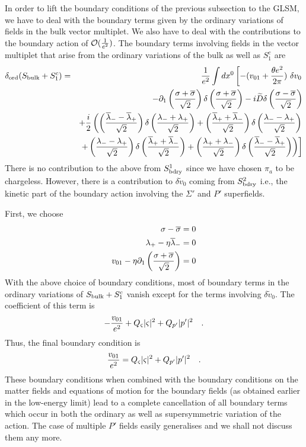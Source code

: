 \documentclass[a4paper,12pt]{article}
\begin{document}
In order to lift the boundary conditions of the previous subsection
to the GLSM,
we have to deal with the boundary terms given by the ordinary
variations of fields in the bulk vector multiplet. We also
have to deal with the contributions to the boundary action of
${\cal O}({1\over{e^2}})$. 
The boundary terms involving fields in the vector multiplet
that arise from the ordinary variations of the 
bulk as well as $S_1^c$ are
\begin{eqnarray*}
\delta_{\rm ord} (S_{\rm bulk}+S_1^c) &=& {1\over{e^2}} \int dx^0 \left [
-(v_{01} + {{\theta e^2} \over{2\pi}})\ \delta v_0 \right. \\ 
&&- \partial_1\left({{\sigma + \overline{\sigma}}\over{\sqrt2}}
\right) \delta \left({{\sigma + \overline{\sigma}}\over{\sqrt2}} \right)
-i\widetilde{D} 
\delta \left({{\sigma - \overline{\sigma}}\over{\sqrt2}} \right)   \\
&& +{i\over2}\left(
\left({{\overline{\lambda}_- -
\overline{\lambda}_+}\over{\sqrt2}}\right)
\delta \left({{\lambda_- + \lambda_+}\over{\sqrt2}}\right)
+ \left({{\overline{\lambda}_+ +
\overline{\lambda}_-}\over{\sqrt2}}\right)
\delta \left({{\lambda_- - \lambda_+}\over{\sqrt2}}\right)\right. \\
&&\left.\left.+ \left({{\lambda_- - \lambda_+}\over{\sqrt2}}\right)
\delta \left({{\overline{\lambda}_+ + 
\overline{\lambda}_-}\over{\sqrt2}}\right)
+ \left({{\lambda_+ + \lambda_-}\over{\sqrt2}}\right)
\delta \left({{\overline{\lambda}_- - 
\overline{\lambda}_+}\over{\sqrt2}}\right)
\right)  \right]
\end{eqnarray*}
There is no contribution to the above from $S^1_{\rm bdry}$ since we have
chosen $\pi_a$ to be chargeless. However, there is a contribution
to $\delta \tilde{v}_0$ coming from $S^2_{\rm bdry}$ i.e., the kinetic part of
the boundary action involving the $\Sigma'$ and $P'$ superfields.


First, we choose
\begin{eqnarray}
\sigma -\overline{\sigma}= 0 \\
\lambda_+ - \eta \overline{\lambda}_- = 0 \\
v_{01}- \eta \partial_1\left({{\sigma +
\overline{\sigma}}\over{\sqrt2}}\right)=0
\end{eqnarray}
With the above choice of boundary conditions, most of boundary terms in
the ordinary variations of $S_{\rm bulk} + S_1^c$ vanish except for the
terms involving $\delta \tilde{v}_0$. The coefficient of this term is
$$
-{v_{01}\over{e^2}} + Q_\varsigma |\varsigma|^2 + Q_{p'} |p'|^2\quad.
$$
Thus, the final boundary condition is
\begin{equation}
{v_{01}\over{e^2}} = Q_\varsigma |\varsigma|^2 + Q_{p'} |p'|^2\quad.
\end{equation}
These boundary conditions when combined with the  boundary conditions 
on the matter fields and equations  of motion for the boundary fields
(as obtained earlier in the low-energy limit)
lead to a complete cancellation of all boundary terms which occur in
both the ordinary as well as supersymmetric variation of the action.
The case of multiple $P'$ fields easily generalises and we shall not
discuss them any more.
\end{document}
